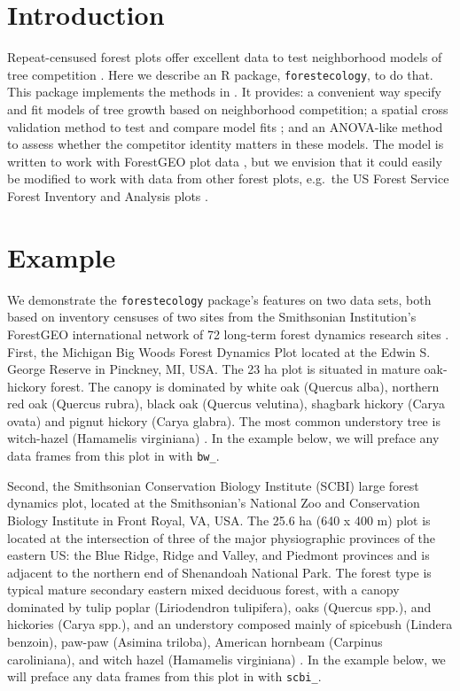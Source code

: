 \documentclass[12pt]{article}
\begin{document}
\hypertarget{introduction}{%
\section{Introduction}\label{introduction}}

Repeat-censused forest plots offer excellent data to test neighborhood
models of tree competition \citet{allen_permutation_2020}
\citet{canham_neighborhood_2006} \citet{uriarte_spatially_2004}. Here we
describe an R package, \texttt{forestecology}, to do that. This package
implements the methods in \citet{allen_permutation_2020}. It provides: a
convenient way specify and fit models of tree growth based on
neighborhood competition; a spatial cross validation method to test and
compare model fits \citet{roberts_cross-validation_2017}; and an
ANOVA-like method to assess whether the competitor identity matters in
these models. The model is written to work with ForestGEO plot data
\citet{andersonteixeira_ctfs-forestgeo_2015}, but we envision that it
could easily be modified to work with data from other forest plots,
e.g.~the US Forest Service Forest Inventory and Analysis plots
\citet{smith_forest_2002}.

\hypertarget{example}{%
\section{Example}\label{example}}

We demonstrate the \texttt{forestecology} package's features on two data
sets, both based on inventory censuses of two sites from the Smithsonian
Institution's ForestGEO international network of 72 long‐term forest
dynamics research sites \citet{andersonteixeira_ctfs-forestgeo_2015}.
First, the Michigan Big Woods Forest Dynamics Plot located at the Edwin
S. George Reserve in Pinckney, MI, USA. The 23 ha plot is situated in
mature oak-hickory forest. The canopy is dominated by white oak (Quercus
alba), northern red oak (Quercus rubra), black oak (Quercus velutina),
shagbark hickory (Carya ovata) and pignut hickory (Carya glabra). The
most common understory tree is witch-hazel (Hamamelis virginiana)
\citet{allen_michigan_2020}. In the example below, we will preface any
data frames from this plot in with \texttt{bw\_}.

Second, the Smithsonian Conservation Biology Institute (SCBI) large
forest dynamics plot, located at the Smithsonian's National Zoo and
Conservation Biology Institute in Front Royal, VA, USA. The 25.6 ha (640
x 400 m) plot is located at the intersection of three of the major
physiographic provinces of the eastern US: the Blue Ridge, Ridge and
Valley, and Piedmont provinces and is adjacent to the northern end of
Shenandoah National Park. The forest type is typical mature secondary
eastern mixed deciduous forest, with a canopy dominated by tulip poplar
(Liriodendron tulipifera), oaks (Quercus spp.), and hickories (Carya
spp.), and an understory composed mainly of spicebush (Lindera benzoin),
paw-paw (Asimina triloba), American hornbeam (Carpinus caroliniana), and
witch hazel (Hamamelis virginiana) \citet{bourg_initial_2013}. In the
example below, we will preface any data frames from this plot in with
\texttt{scbi\_}.
\end{document}

